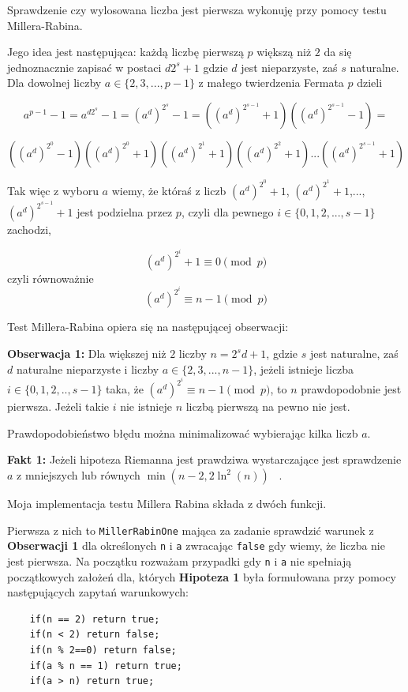 \documentclass{article}
\begin{document}
Sprawdzenie czy wylosowana liczba jest pierwsza wykonuję przy pomocy testu Millera-Rabina. 

Jego idea jest następująca: każdą liczbę pierwszą $p$ większą niż $2$ da się jednoznacznie zapisać w 
postaci $d2^s+1$
gdzie $d$ jest nieparzyste, zaś $s$ naturalne. Dla dowolnej liczby
$a \in \{2,3,...,p-1\}$ z małego twierdzenia Fermata $p$ dzieli

$$ a^{p-1}-1=a^{d2^s}-1=(a^d)^{2^s}-1=((a^d)^{2^{s-1}}+1)((a^d)^{2^{s-1}}-1)=$$


$$((a^d)^{2^0}-1)((a^d)^{2^0}+1)((a^d)^{2^1}+1)((a^d)^{2^2}+1)...((a^d)^{2^{s-1}}+1) $$

Tak więc z wyboru $a$ wiemy, że któraś z liczb  $(a^d)^{2^0}+1$, $(a^d)^{2^1}+1$,..., $(a^d)^{2^{s-1}}+1$
jest podzielna przez $p$, czyli dla pewnego $i \in \{0,1,2,...,s-1\}$ zachodzi, 

$$(a^d)^{2 ^i} + 1\equiv 0 \pmod p$$
czyli równoważnie 
$$(a^d)^{2 ^i} \equiv n-1\pmod p$$

Test Millera-Rabina opiera się na następującej obserwacji:
\begin{tcolorbox}
\textbf{Obserwacja 1:} Dla większej niż $2$ liczby $n=2^sd+1$, gdzie $s$ jest naturalne, zaś $d$ naturalne nieparzyste i liczby $
a \in \{2,3,...,n-1\}$,
jeżeli istnieje liczba $i \in \{0,1,2,..,s-1\}$ taka, że $(a^d)^{2^i} \equiv n-1 \pmod p$, to $n$
prawdopodobnie jest pierwsza. Jeżeli takie $i$ nie istnieje $n$ liczbą pierwszą na pewno nie jest.
\end{tcolorbox}

Prawdopodobieństwo błędu można minimalizować wybierając kilka liczb $a$. 
\begin{tcolorbox}
    \textbf{Fakt 1:} Jeżeli hipoteza Riemanna jest 
    prawdziwa wystarczające jest sprawdzenie $a$ z mniejszych lub równych
    $\min(n-2,2\ln^2(n))$ ~\cite{durnoga2017large}.
    
\end{tcolorbox}

Moja implementacja testu Millera Rabina składa z dwóch funkcji. 

Pierwsza z nich to \texttt{MillerRabinOne} mająca za zadanie sprawdzić warunek z \textbf{Obserwacji 1} dla określonych
\texttt{n} i \texttt{a} zwracając \texttt{false} gdy wiemy, że liczba nie jest pierwsza.
Na początku rozważam przypadki gdy \texttt{n} i \texttt{a} nie spełniają początkowych założeń dla, których
\textbf{Hipoteza 1} była formułowana przy pomocy następujących zapytań warunkowych:
\begin{lstlisting}
    if(n == 2) return true;
    if(n < 2) return false;
    if(n % 2==0) return false;
    if(a % n == 1) return true;
    if(a > n) return true;
\end{lstlisting}
\end{document}
